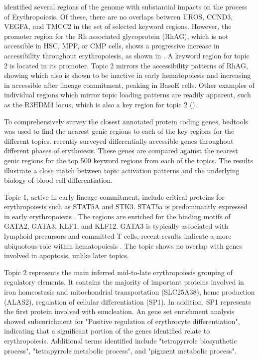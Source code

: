 \textcite{Ludwig2019} identified several regions of the genome with substantial impacts on the process of Erythropoiesis. Of these, there are no overlaps between UROS, CCND3, VEGFA, and TMCC2 in the set of selected keyword regions. However, the promoter region for the Rh associated glycoprotein (RhAG), which is not accessible in HSC, MPP, or CMP cells, shows a progressive increase in accessibility throughout erythropoiesis, as shown in . A keyword region for topic 2 is located in its promoter. Topic 2 mirrors the accessibility patterns of RhAG, showing  which also is shown to be inactive in early hematopoiesis and increasing in accessible after lineage commitment, peaking in BasoE cells. Other examples of individual regions which mirror topic loading patterns are readily apparent, such as the R3HDM4 locus, which is also a key region for topic 2 (). 

To comprehensively survey the closest annotated protein coding genes, bedtools was used to find the nearest genic regions to each of the key regions for the different topics. \textcite{Mello2019} recently surveyed differentially accessible genes throughout different phases of erythoiesis. These genes are compared against the nearest genic regions for the top 500 keyword regions from each of the topics. The results illustrate a close match between topic activation patterns and the underlying biology of blood cell differentiation.

Topic 1, active in early lineage commitment, include critical proteins for erythropoiesis such as STAT5A and STK3. STAT5a is predominantly expressed in early erythropoiesis \cite{Pishesha2014}. The regions are enriched for the binding motifs of GATA2, GATA3, KLF1, and KLF12. GATA3 is typically associated with lymphoid precursors and committed T cells, recent results indicate a more ubiquotous role within hematopoiesis \cite{Chen2001}. The topic shows no overlap with genes involved in apoptosis, unlike later topics.  

Topic 2 represents the main inferred mid-to-late erythropoiesis grouping of regulatory elements. It contains the majority of important proteins involved in iron homeostasis and mitochondrial transportation (SLC25A38), heme production (ALAS2), regulation of cellular differentiation (SP1). In addition, SP1 represents the first protein involved with enucleation. An gene set enrichment analysis showed subenrichment for "Positive regulation of erythrocyte differentiation", indicating that a significant portion of the genes identified relate to erythropoiesis. Additional terms identified include "tetrapyrrole biosynthetic process", "tetrapyrrole metabolic process", and "pigment metabolic process".  

